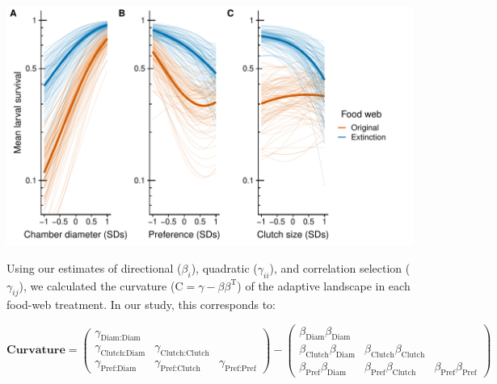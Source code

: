 \documentclass[11pt,]{article}
\let\origfigure\figure
\let\endorigfigure\endfigure
\renewenvironment{figure}[1][2] {
    \expandafter\origfigure\expandafter[H]
} {
    \endorigfigure
}
\begin{document}
\begin{figure}
\centering
\includegraphics{../analyses/UV_landscapes.pdf}
\caption{\label{fig:UV_Landscape}Adaptive landscape of gall midge
phenotypes in the original food web and with the extinction of larval
parasitoids. Each panel corresponds to a different phenotypic trait:
chamber diameter (A); oviposition preference (B); and clutch size (C).
Bold lines represent selection experienced in the original food web
(orange) and with consumer extinctions (blue). Thin lines represent
bootstrapped replicates to show the uncertainty in selection. For
clarity, we only display 100 bootstraps even though inferences are based
on 1,000 replicates. Note that mean larval survival is plotted on a
natural log scale to reflect the mathematical defintion of the adaptive
landscape.}
\end{figure}

Using our estimates of directional (\(\beta_i\)), quadratic
(\(\gamma_{ii}\)), and correlation selection (\(\gamma_{ij}\)), we
calculated the curvature (\(\text{C}=\gamma - \beta \beta^\text{T}\)) of
the adaptive landscape in each food-web treatment. In our study, this
corresponds to:

\[\textbf{Curvature} = \begin{pmatrix} \gamma_{\text{Diam:Diam}}&& \\ \gamma_{\text{Clutch:Diam}}&\gamma_{\text{Clutch:Clutch}}& \\ \gamma_{\text{Pref:Diam}} & \gamma_{\text{Pref:Clutch}} &\gamma_{\text{Pref:Pref}} \end{pmatrix} - \begin{pmatrix} \beta_{\text{Diam}}\beta_{\text{Diam}}&& \\ \beta_{\text{Clutch}}\beta_{\text{Diam}}&\beta_{\text{Clutch}}\beta_{\text{Clutch}}& \\ \beta_{\text{Pref}}\beta_{\text{Diam}} & \beta_{\text{Pref}}\beta_{\text{Clutch}} &\beta_{\text{Pref}}\beta_{\text{Pref}} \end{pmatrix}\]
\end{document}

